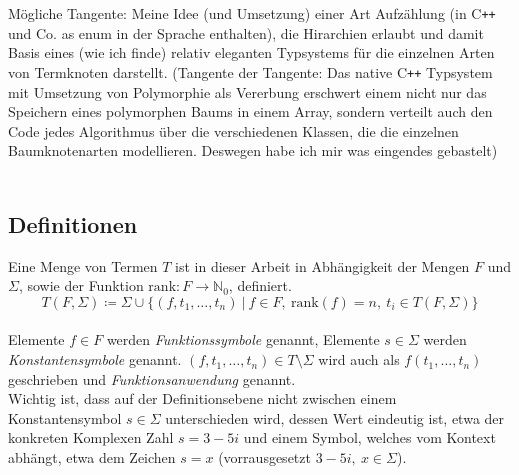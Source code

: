 \documentclass{article}
\begin{document}
Mögliche Tangente: Meine Idee (und Umsetzung) einer Art Aufzählung (in C\texttt{++} und Co. as enum in der Sprache enthalten), die Hirarchien erlaubt und damit Basis eines (wie ich finde) relativ eleganten Typsystems für die einzelnen Arten von Termknoten darstellt. (Tangente der Tangente: Das native C\texttt{++} Typsystem mit Umsetzung von Polymorphie als Vererbung erschwert einem nicht nur das Speichern eines polymorphen Baums in einem Array, sondern verteilt auch den Code jedes Algorithmus über die verschiedenen Klassen, die die einzelnen Baumknotenarten modellieren. Deswegen habe ich mir was eingendes gebastelt)
~\\~

\clearpage

\subsection{Definitionen}
Eine Menge von Termen $T$ ist in dieser Arbeit in Abhängigkeit der Mengen $F$ und $\Sigma$, sowie der Funktion $\mathrm{rank} : F \rightarrow \mathbb{N}_0$, definiert. $$T(F, \Sigma) \coloneqq \Sigma \cup \{(f, t_1, \dots, t_n)~|~f\in F,~\mathrm{rank}(f) = n,~ t_i \in T(F, \Sigma)\}$$ \\
Elemente $f\in F$ werden \textit{Funktionssymbole} genannt, Elemente $s \in \Sigma$ werden \textit{Konstantensymbole} genannt. $(f, t_1, \dots, t_n) \in T \setminus \Sigma$ wird auch als $f(t_1, \dots, t_n)$ geschrieben und \textit{Funktionsanwendung} genannt. \\
Wichtig ist, dass auf der Definitionsebene nicht zwischen einem Konstantensymbol $s \in \Sigma$ unterschieden wird, dessen Wert eindeutig ist, etwa der konkreten Komplexen Zahl $s = 3-5i$ und einem Symbol, welches vom Kontext abhängt, etwa dem Zeichen $s = x$ (vorrausgesetzt $3-5i,~x \in \Sigma$). 
\end{document}

